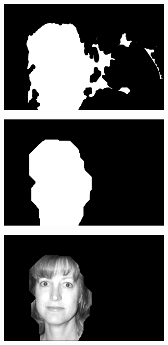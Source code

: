 \begin{figure}[H]
\begin{subfigure}{.24\textwidth}
  \centering
  \includegraphics[width=0.95\textwidth]{img/fd/ClosingOnFaceMask.png}
  \caption{}
\end{subfigure}
\begin{subfigure}{.24\textwidth}
  \centering
  \includegraphics[width=0.95\textwidth]{img/fd/ShrinkFaceMask.png}
  \caption{}
\end{subfigure}
\begin{subfigure}{.24\textwidth}
  \centering
  \includegraphics[width=0.95\textwidth]{img/fd/ImadjustGrayFace.png}

\end{subfigure}
\end{figure}
